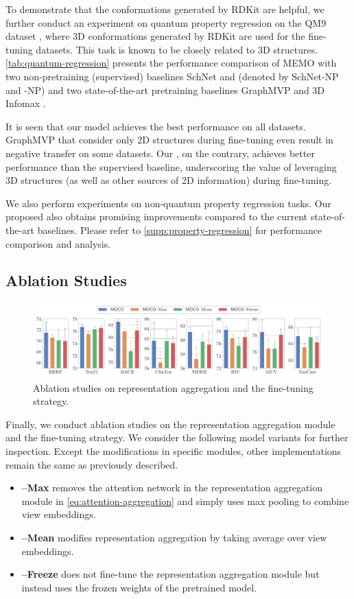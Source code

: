 To demonstrate that the conformations generated by RDKit are helpful, we further conduct an experiment on quantum property regression on the QM9 dataset \cite{Ramakrishnan:2014ij}, where 3D conformations generated by RDKit are used for the fine-tuning datasets. This task is known to be closely related to 3D structures.
\cref{tab:quantum-regression} presents the performance comparison of MEMO with two non-pretraining (supervised) baselines SchNet and \themodel (denoted by SchNet-NP and \themodel-NP) and two state-of-the-art pretraining baselines GraphMVP \cite{Liu:2022vr} and 3D Infomax \cite{Stark:2021ug}.

It is seen that our \themodel model achieves the best performance on all datasets.
GraphMVP that consider only 2D structures during fine-tuning even result in negative transfer on some datasets. Our \themodel, on the contrary, achieves better performance than the supervised baseline, underscoring the value of leveraging 3D structures (as well as other sources of 2D information) during fine-tuning.

We also perform experiments on non-quantum property regression tasks. Our proposed \themodel also obtains promising improvements compared to the current state-of-the-art baselines. Please refer to \cref{supp:property-regression} for performance comparison and analysis.

\subsection{Ablation Studies}
\begin{figure}[b]
	\centering
	\includegraphics[width=\linewidth,bb=0 0 601 156]{figures/ablation.pdf}
	\caption{Ablation studies on representation aggregation and the fine-tuning strategy.}
	\label{fig:ablation}
\end{figure}

Finally, we conduct ablation studies on the representation aggregation module and the fine-tuning strategy.
We consider the following model variants for further inspection.
Except the modifications in specific modules, other implementations remain the same as previously described.
\begin{itemize}
	\item \textbf{\themodel --Max} removes the attention network in the representation aggregation module in \cref{eq:attention-aggregation} and simply uses max pooling to combine view embeddings.
	\item \textbf{\themodel --Mean} modifies representation aggregation by taking average over view embeddings.
	\item \textbf{\themodel --Freeze} does not fine-tune the representation aggregation module but instead uses the frozen weights of the pretrained model.
\end{itemize}

